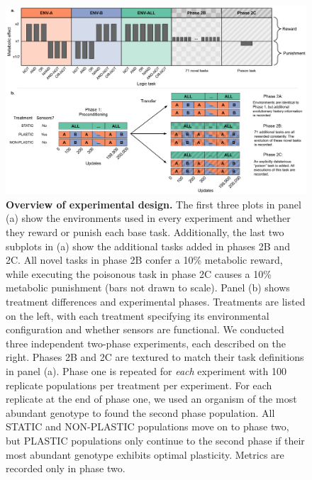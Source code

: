 \begin{figure}[h!]
    \centering
    \includegraphics[width=1\textwidth]{media/experimental-design.pdf}
    \caption{\small
    \textbf{Overview of experimental design.}
    The first three plots in panel (a) show the environments used in every experiment and whether they reward or punish each base task. 
    Additionally, the last two subplots in (a) show the additional tasks added in phases 2B and 2C. 
    All novel tasks in phase 2B confer a 10\% metabolic reward, while executing the poisonous task in phase 2C causes a 10\% metabolic punishment (bars not drawn to scale). 
    Panel (b) shows treatment differences and experimental phases. 
    Treatments are listed on the left, with each treatment specifying its environmental configuration and whether sensors are functional.
    We conducted three independent two-phase experiments, each described on the right.
    Phases 2B and 2C are textured to match their task definitions in panel (a). 
    Phase one is repeated for \textit{each} experiment with 100 replicate populations per treatment per experiment. 
    For each replicate at the end of phase one, we used an organism of the most abundant genotype to found the second phase population. 
    All STATIC and NON-PLASTIC populations move on to phase two, but PLASTIC populations only continue to the second phase if their most abundant genotype exhibits optimal plasticity. 
    Metrics are recorded only in phase two.
    }
    \label{fig:experimental-design}
\end{figure}